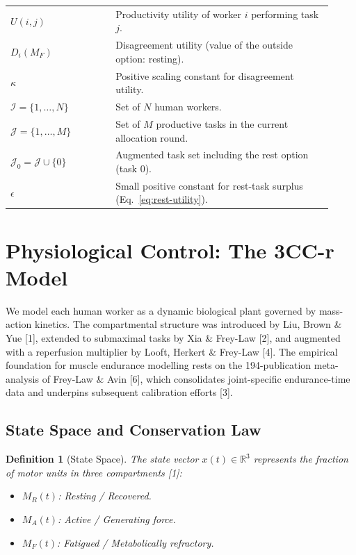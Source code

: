 \documentclass[11pt,a4paper]{article}
\newtheorem{definition}[theorem]{Definition}
\begin{document}
\begin{center}
\begin{tabular}{p{0.30\linewidth}p{0.62\linewidth}}
$U(i,j)$ & Productivity utility of worker $i$ performing task $j$. \\
$D_i(M_F)$ & Disagreement utility (value of the outside option: resting). \\
$\kappa$ & Positive scaling constant for disagreement utility. \\
$\mathcal{I} = \{1,\ldots,N\}$ & Set of $N$ human workers. \\
$\mathcal{J} = \{1,\ldots,M\}$ & Set of $M$ productive tasks in the current allocation round. \\
$\mathcal{J}_0 = \mathcal{J} \cup \{0\}$ & Augmented task set including the rest option (task 0). \\
$\epsilon$ & Small positive constant for rest-task surplus (Eq.~\ref{eq:rest-utility}). \\
\bottomrule
\end{tabular}
\end{center}

\section{Physiological Control: The 3CC-r Model}\label{sec:3ccr}

We model each human worker as a dynamic biological plant governed by
mass-action kinetics. The compartmental structure was introduced by
Liu, Brown \& Yue [1], extended to submaximal tasks by Xia \&
Frey-Law [2], and augmented with a reperfusion multiplier by Looft,
Herkert \& Frey-Law [4]. The empirical foundation for muscle endurance
modelling rests on the 194-publication meta-analysis of Frey-Law \&
Avin [6], which consolidates joint-specific endurance-time data and
underpins subsequent calibration efforts [3].

\subsection{State Space and Conservation Law}

\begin{definition}[State Space]
The state vector $x(t) \in \mathbb{R}^3$ represents the fraction of
motor units in three compartments [1]:
\begin{itemize}[noitemsep]
\item $M_R(t)$: Resting / Recovered.
\item $M_A(t)$: Active / Generating force.
\item $M_F(t)$: Fatigued / Metabolically refractory.
\end{itemize}
\end{definition}
\end{document}
